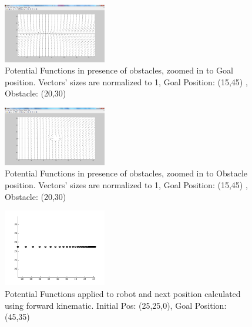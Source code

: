 \documentclass[conference,12pt]{IEEEtran}
\begin{document}
\begin{figure}[htp]
\begin{center}
\leavevmode
\includegraphics[width=0.4\textwidth] {PF-goal.png}
\end{center}
\caption{Potential Functions in presence of obstacles, zoomed in to Goal position. Vectors' sizes are normalized to 1, Goal Position: (15,45) , Obstacle: (20,30)}
\label{fig:PF2}
\end{figure}

\begin{figure}[htp]
\begin{center}
\leavevmode
\includegraphics[width=0.4\textwidth] {PF-obs.png}
\end{center}
\caption{Potential Functions in presence of obstacles, zoomed in to Obstacle position. Vectors' sizes are normalized to 1, Goal Position: (15,45) , Obstacle: (20,30)}
\label{fig:PF3}
\end{figure}

\begin{figure}[htp]
\begin{center}
\leavevmode
\includegraphics[width=0.4\textwidth] {PF-straight.png}
\end{center}
\caption{Potential Functions applied to robot and next position calculated using forward kinematic. Initial Pos: (25,25,0), Goal Position: (45,35)}
\label{fig:PF_Path1}
\end{figure}
\end{document}
